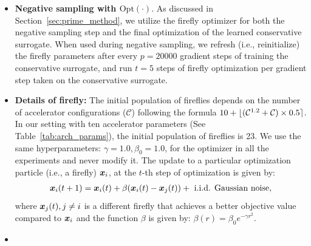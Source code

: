 \begin{itemize}
    \item \textbf{Negative sampling with $\mathrm{Opt}(\cdot)$}. As discussed in Section~\ref{sec:prime_method}, we utilize the firefly optimizer for both the negative sampling step and the final optimization of the learned conservative surrogate. When used during negative sampling, we refresh (i.e., reinitialize) the firefly parameters after every $p = 20000$ gradient steps of training the conservative surrogate, and run $t = 5$ steps of firefly optimization per gradient step taken on the conservative surrogate. 
    \item \textbf{Details of firefly:} The initial population of fireflies depends on the number of accelerator configurations ($\mathcal{C}$) following the formula $10+\lfloor(\mathcal{C}^{1.2}+\mathcal{C})\times0.5\rceil$. In our setting with ten accelerator parameters (See Table~\ref{tab:arch_params}), the initial population of fireflies is 23. We use the same hyperparameters: $\gamma = 1.0, \beta_0 = 1.0$, for the optimizer in all the experiments and never modify it. The update to a particular optimization particle (i.e., a firefly) ${\boldsymbol{x}}_i$, at the $t$-th step of optimization is given by: 
    \begin{equation}
    \label{eqn:firefly1}
    \begin{aligned}
    {{\boldsymbol{x}}_{i}(t+1) = {\boldsymbol{x}}_{i}(t) + \beta({\boldsymbol{x}}_{i}(t) - {\boldsymbol{x}}_{j}(t)) + ~\text{i.i.d. Gaussian noise},}
    \end{aligned}
    \end{equation}
    where ${\boldsymbol{x}}_j(t), j \neq i$ is a different firefly that achieves a better objective value compared to ${\boldsymbol{x}}_i$ and the function $\beta$ is given by: $\beta(r) = \beta_{0}e^{-\gamma{}r^2}$.
    \item {}
    

\end{itemize}

